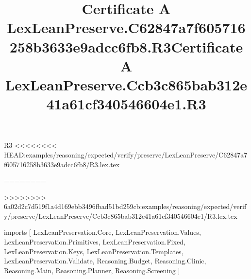\begin{lexlean}{R3}
<<<<<<<< HEAD:examples/reasoning/expected/verify/preserve/LexLeanPreserve/C62847a7f605716258b3633e9adcc6fb8/R3.lex.tex
\title{Certificate A LexLeanPreserve.C62847a7f605716258b3633e9adcc6fb8.R3}
========
\title{Certificate A LexLeanPreserve.Ccb3c865bab312e41a61cf340546604e1.R3}
>>>>>>>> 6a02d2c7d519f1a4d169ebb3496fbad51bd259cb:examples/reasoning/expected/verify/preserve/LexLeanPreserve/Ccb3c865bab312e41a61cf340546604e1/R3.lex.tex
\begin{coremodule}
imports [
  LexLeanPreservation.Core,
  LexLeanPreservation.Values,
  LexLeanPreservation.Primitives,
  LexLeanPreservation.Fixed,
  LexLeanPreservation.Keys,
  LexLeanPreservation.Templates,
  LexLeanPreservation.Validate,
  Reasoning.Budget,
  Reasoning.Clinic,
  Reasoning.Main,
  Reasoning.Planner,
  Reasoning.Screening
]


\end{coremodule}
\end{lexlean}
